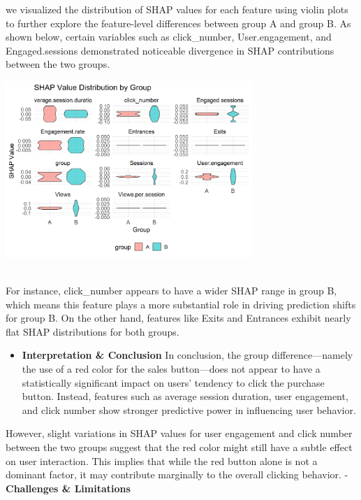 \documentclass[
  letterpaper,
  DIV=11,
  numbers=noendperiod]{scrartcl}
\providecommand{\tightlist}{%
  \setlength{\itemsep}{0pt}\setlength{\parskip}{0pt}}\usepackage{longtable,booktabs,array}
\begin{document}
we visualized the distribution of SHAP values for each feature using
violin plots to further explore the feature-level differences between
group A and group B. As shown below, certain variables such as
click\_number, User.engagement, and Engaged.sessions demonstrated
noticeable divergence in SHAP contributions between the two groups.\\
\begin{center}
\includegraphics[width=0.7\textwidth,height=\textheight]{data_ana_pj3_files/figure-html/unnamed-chunk-12-1.png}
\end{center}
\\
For instance, click\_number appears to have a wider SHAP range in group
B, which means this feature plays a more substantial role in driving
prediction shifts for group B. On the other hand, features like Exits
and Entrances exhibit nearly flat SHAP distributions for both groups.

\begin{itemize}
\tightlist
\item
  \textbf{Interpretation \& Conclusion} In conclusion, the group
  difference---namely the use of a red color for the sales button---does
  not appear to have a statistically significant impact on users'
  tendency to click the purchase button. Instead, features such as
  average session duration, user engagement, and click number show
  stronger predictive power in influencing user behavior.
\end{itemize}

However, slight variations in SHAP values for user engagement and click
number between the two groups suggest that the red color might still
have a subtle effect on user interaction. This implies that while the
red button alone is not a dominant factor, it may contribute marginally
to the overall clicking behavior. - \textbf{Challenges \& Limitations}
\end{document}

